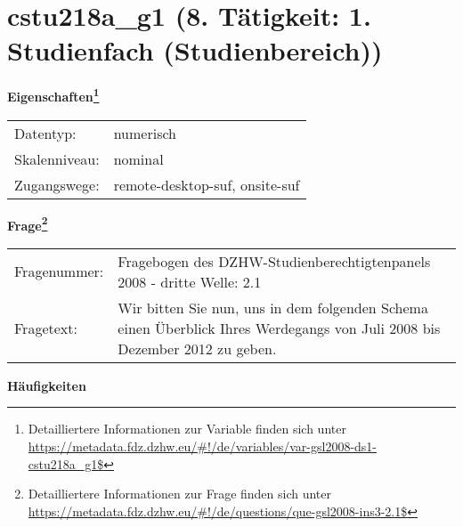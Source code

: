 
    \setcounter{footnote}{0}

    \vspace*{-1.8cm}
	\section{cstu218a\_g1 (8. Tätigkeit: 1. Studienfach (Studienbereich))}
	\label{section:cstu218a_g1}



    \vspace*{0.5cm}
    \noindent\textbf{Eigenschaften\footnote{Detailliertere Informationen zur Variable finden sich unter
		\url{https://metadata.fdz.dzhw.eu/\#!/de/variables/var-gsl2008-ds1-cstu218a_g1$}}}\\
	\begin{tabularx}{\hsize}{@{}lX}
	Datentyp: & numerisch \\
	Skalenniveau: & nominal \\
	Zugangswege: &
	  remote-desktop-suf, 
	  onsite-suf
 \\
    \end{tabularx}



				\vspace*{0.5cm}
                \noindent\textbf{Frage\footnote{Detailliertere Informationen zur Frage finden sich unter
		              \url{https://metadata.fdz.dzhw.eu/\#!/de/questions/que-gsl2008-ins3-2.1$}}}\\
				\begin{tabularx}{\hsize}{@{}lX}
					Fragenummer: &
					  Fragebogen des DZHW-Studienberechtigtenpanels 2008 - dritte Welle:
					  2.1
 \\
					Fragetext: & Wir bitten Sie nun, uns in dem folgenden Schema einen Überblick Ihres Werdegangs von Juli 2008 bis Dezember 2012 zu geben. \\
				\end{tabularx}





        		\vspace*{0.5cm}
                \noindent\textbf{Häufigkeiten}

